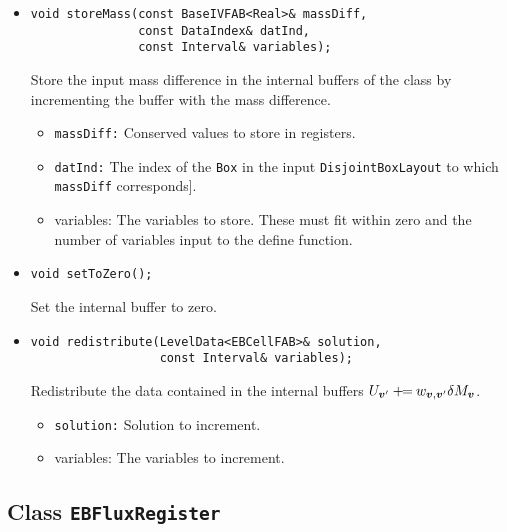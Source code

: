 \begin{itemize}
\item \begin{small}\begin{verbatim}
void storeMass(const BaseIVFAB<Real>& massDiff,
               const DataIndex& datInd,
               const Interval& variables);
\end{verbatim}\end{small}
Store the input mass difference in the internal buffers of the class
by incrementing the buffer with the mass difference.
\begin{itemize}
\item {\tt massDiff:}  Conserved values to store in registers.
\item {\tt datInd:} The index of the {\tt Box} in the input
{\tt DisjointBoxLayout} to which {\tt massDiff} corresponds].
\item {variables:}  The variables to store.  These must fit within
        zero and the number of variables input to the define function.
\end{itemize}

\item \begin{small}\begin{verbatim}
void setToZero();
\end{verbatim}\end{small}
Set the internal buffer to zero.

\item \begin{small}\begin{verbatim}
void redistribute(LevelData<EBCellFAB>& solution,
                  const Interval& variables);
\end{verbatim}\end{small}
Redistribute the data contained in the internal buffers
$U_{{\boldsymbol{v}}'} \mathbin{+\mkern-7mu=}  w_{{\boldsymbol{v}},{\boldsymbol{v}}'} \delta M_{{\boldsymbol{v}}}$.
\begin{itemize}
\item {\tt solution:} Solution to increment.
\item {variables:}  The variables to increment. 
\end{itemize}

\end{itemize}

\subsection{Class {\tt EBFluxRegister}}

